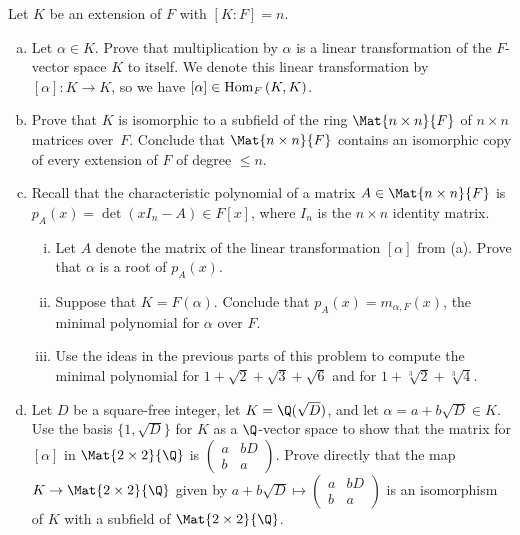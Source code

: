 \documentclass[10pt]{amsart}
\begin{document}
\begin{thm}
  Let $K$ be an extension of $F$ with $[K : F] = n$.  
  \begin{enumerate}[(a)]
  \item
    Let $\alpha\in K$.  Prove that multiplication by $\alpha$ is a linear transformation of the $F$-vector space 
    $K$ to itself.  We denote this linear transformation by $[\alpha] : K \rightarrow K$, so we have 
    $[\alpha] \in \operatorname{Hom}_{F}\left(K, K\right)$.     
  \item 
    Prove that $K$ is isomorphic to a subfield of the ring $\Mat{n\times n}{F}$ of $n\times n$ 
    matrices over~$F$.  Conclude that $\Mat{n\times n}{F}$ contains an isomorphic copy of every
    extension of $F$ of degree $\leq n$.  
  \item 
    Recall that the characteristic polynomial of a matrix $A\in \Mat{n \times n}{F}$ is $p_{A}(x) 
    = \operatorname{det}(xI_n - A)\in F[x]$, where $I_n$ is the $n\times n$ identity matrix.  
    \begin{enumerate}[(i)]
    \item 
      Let $A$ denote the matrix of the linear transformation $[\alpha]$ from (a).  
      Prove that $\alpha$ is a root of $p_{A}(x)$. 
    \item 
      Suppose that $K = F(\alpha)$.  Conclude that $p_{A}(x) = m_{\alpha, F}(x)$, the minimal polynomial 
      for $\alpha$ over $F$.  
    \item 
      Use the ideas in the previous parts of this problem to compute the minimal polynomial for 
      $1 + \sqrt{2} + \sqrt{3} + \sqrt{6}$ and for $1 + \sqrt[3]{2} + \sqrt[3]{4}$.    
    \end{enumerate}
  \item 
    Let $D$ be a square-free integer, let  $K = \Q(\sqrt{D})$, and let $\alpha = a + b\sqrt{D}\in K$.  
    Use the basis $\{1, \sqrt{D}\}$ for $K$ as a $\Q$-vector space to show that the matrix for $[\alpha]$
    in $\Mat{2\times 2}{\Q}$ is $\begin{pmatrix} a & bD \\ b & a \end{pmatrix}$.  
    Prove directly that the map $K \rightarrow \Mat{2\times 2}{\Q}$ given by 
    $a + b\sqrt{D} \mapsto \begin{pmatrix} a & bD \\ b & a\end{pmatrix}$ is an isomorphism of 
      $K$ with a subfield of $\Mat{2\times 2}{\Q}$.  
  \end{enumerate}


\end{thm}
\end{document}

